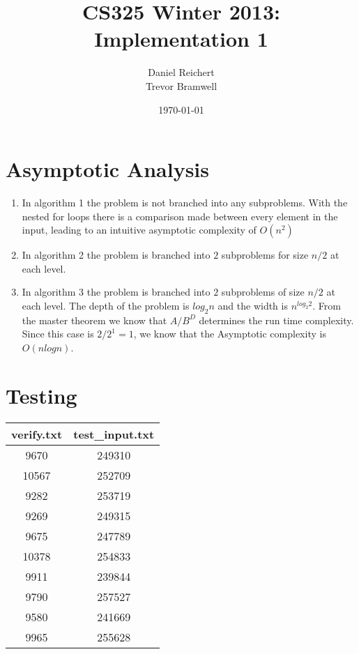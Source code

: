 \documentclass[12pt]{article}
\title{CS325 Winter 2013: Implementation 1}
\author{
    Daniel Reichert \\
    Trevor Bramwell
}
\date{\today}
\begin{document}
\maketitle

\section*{Asymptotic Analysis}
    \begin{enumerate}

    \item In algorithm 1 the problem is not branched into any subproblems.
          With the nested for loops there is a comparison made between
          every element in the input, leading to an intuitive asymptotic
          complexity of $O(n^2)$

	\item In algorithm 2 the problem is branched into $2$ subproblems
          for size $n/2$ at each level.

    \item In algorithm 3 the problem is branched into $2$ subproblems of size
          $n/2$ at each level.  The depth of the problem is $log_2 n$
          and the width is $n^{log_2 2}$.  From the master theorem we know
          that $A/B^D$ determines the run time complexity.  Since this
          case is $2/2^1 = 1$, we know that the Asymptotic complexity is
          $O(n log n)$.

    \end{enumerate}

\section*{Testing}

\begin{center}
\begin{tabular}{|c|c|}
\hline
verify.txt & test\_input.txt \\ \hline
9670  & 249310 \\ \hline
10567 & 252709 \\ \hline 
9282  & 253719 \\ \hline 
9269  & 249315 \\ \hline 
9675  & 247789 \\ \hline 
10378 & 254833 \\ \hline 
9911  & 239844 \\ \hline 
9790  & 257527 \\ \hline 
9580  & 241669 \\ \hline 
9965  & 255628 \\
\hline
\end{tabular}
\end{center}
\end{document}

